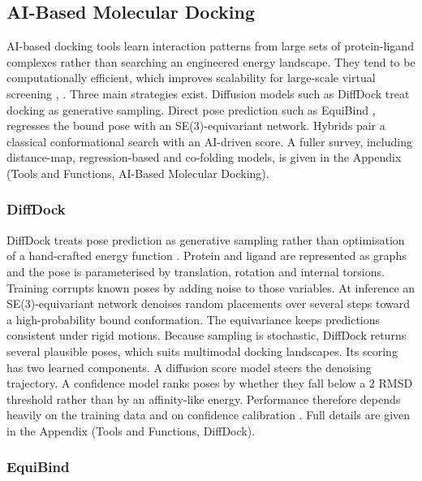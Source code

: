 \hypertarget{ai-based-molecular-docking}{%
\subsection{AI-Based Molecular Docking}\label{ai-based-molecular-docking}}

AI-based docking tools learn interaction patterns from large sets of protein-ligand complexes rather than searching an engineered energy landscape. They tend to be computationally efficient, which improves scalability for large-scale virtual screening \cite{ref010}, \cite{ref027}. Three main strategies exist. Diffusion models such as DiffDock \cite{ref024} treat docking as generative sampling. Direct pose prediction such as EquiBind \cite{ref009}, \cite{ref010} regresses the bound pose with an SE(3)-equivariant network. Hybrids pair a classical conformational search with an AI-driven score. A fuller survey, including distance-map, regression-based and co-folding models, is given in the Appendix (Tools and Functions, AI-Based Molecular Docking).

\hypertarget{diffdock}{%
\subsubsection{DiffDock}\label{diffdock}}

DiffDock treats pose prediction as generative sampling rather than optimisation of a hand-crafted energy function \cite{ref024}. Protein and ligand are represented as graphs and the pose is parameterised by translation, rotation and internal torsions. Training corrupts known poses by adding noise to those variables. At inference an SE(3)-equivariant network denoises random placements over several steps toward a high-probability bound conformation. The equivariance keeps predictions consistent under rigid motions. Because sampling is stochastic, DiffDock returns several plausible poses, which suits multimodal docking landscapes. Its scoring has two learned components. A diffusion score model steers the denoising trajectory. A confidence model ranks poses by whether they fall below a 2\angstrom{} RMSD threshold rather than by an affinity-like energy. Performance therefore depends heavily on the training data and on confidence calibration \cite{ref024}. Full details are given in the Appendix (Tools and Functions, DiffDock).

\hypertarget{equibind}{%
\subsubsection{EquiBind}\label{equibind}}

